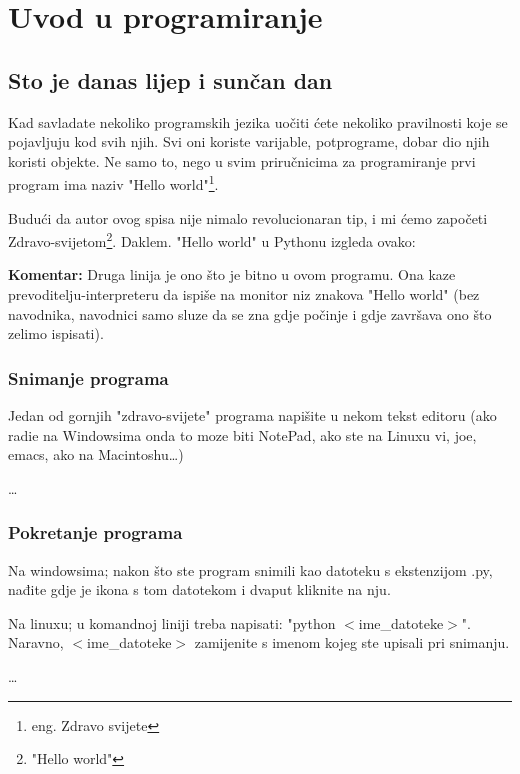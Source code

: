 \chapter{Uvod u programiranje}

\section{Sto je danas lijep i sunčan dan}

Kad savladate nekoliko programskih jezika uočiti ćete
nekoliko pravilnosti koje se pojavljuju kod svih njih. Svi oni
koriste varijable, potprograme, dobar dio njih koristi objekte. Ne
samo to, nego u svim priručnicima za programiranje prvi program
ima naziv "Hello world"\footnote{eng.  Zdravo svijete}.

Budući da autor ovog spisa nije nimalo revolucionaran tip, i
mi ćemo započeti Zdravo-svijetom\footnote{\hspace*{2mm}"Hello
world"}.  Daklem. "Hello world" u Pythonu izgleda ovako:


\textbf{Komentar:} Druga linija je ono što je bitno u ovom
programu. Ona kaze prevoditelju-interpreteru da ispiše na
monitor niz znakova "Hello world" (bez navodnika, navodnici samo
sluze da se zna gdje počinje i gdje završava ono što
zelimo ispisati).

\subsection{Snimanje programa}

Jedan od gornjih "zdravo-svijete" programa napišite u nekom
tekst editoru (ako radie na Windowsima onda to moze biti NotePad,
ako ste na Linuxu vi, joe, emacs, ako na Macintoshu\dots)

\dots

\subsection{Pokretanje programa}

Na windowsima; nakon što ste program snimili kao datoteku s ekstenzijom
.py, nađite gdje je ikona s tom datotekom i dvaput kliknite na nju.

Na linuxu; u komandnoj liniji treba napisati: "python $<$ime\_datoteke$>$".
Naravno, $<$ime\_datoteke$>$ zamijenite s imenom kojeg ste upisali pri
snimanju.

\dots

